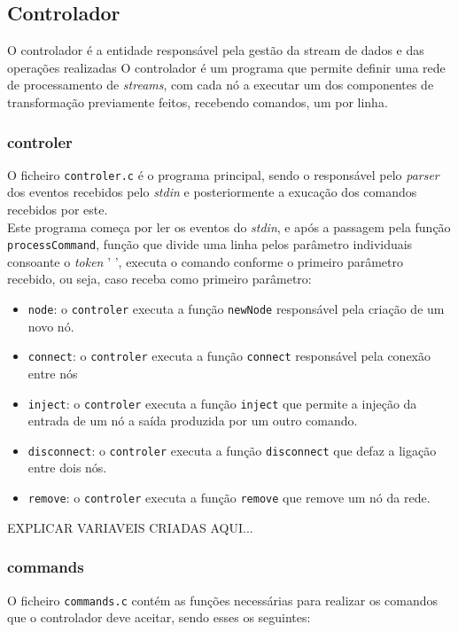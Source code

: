 \documentclass[12pt]{article}
\begin{document}
\subsection{Controlador}
O controlador é a entidade responsável pela gestão da stream de dados e das operações realizadas
O controlador é um programa que permite definir uma rede de processamento de \textit{streams}, com cada nó a executar um dos componentes de transformação previamente feitos, recebendo comandos, um por linha. 

\subsubsection{controler}
O ficheiro \texttt{controler.c} é o programa principal, sendo o responsável pelo \textit{parser} dos eventos recebidos pelo \textit{stdin} e posteriormente a exucação dos comandos recebidos por este.
\\Este programa começa por ler os eventos do \textit{stdin}, e após a passagem pela função \texttt{processCommand}, função que divide uma linha pelos parâmetro individuais consoante o \textit{token} ' ', executa o comando conforme o primeiro parâmetro recebido, ou seja, caso receba como primeiro parâmetro:
\begin{itemize}
\item \texttt{node}: o \texttt{controler} executa a função \texttt{newNode} responsável pela criação de um novo nó.
\item \texttt{connect}: o \texttt{controler} executa a função \texttt{connect} responsável pela conexão entre nós
\item \texttt{inject}: o \texttt{controler} executa a função \texttt{inject} que permite a injeção da entrada de um nó a saída produzida por um outro comando.
\item \texttt{disconnect}: o \texttt{controler} executa a função \texttt{disconnect} que defaz a ligação entre dois nós.
\item \texttt{remove}: o \texttt{controler} executa a função \texttt{remove} que remove um nó da rede.
\end{itemize}
EXPLICAR VARIAVEIS CRIADAS AQUI...

\subsubsection{commands}
O ficheiro \texttt{commands.c} contém as funções necessárias para realizar os comandos que o controlador deve aceitar, sendo esses os seguintes:
\end{document}
